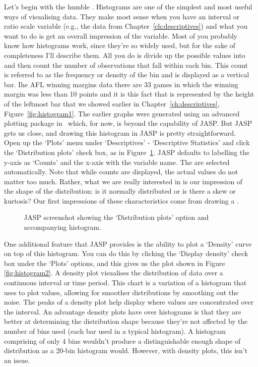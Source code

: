 Let's begin with the humble . Histograms are one of the simplest and most useful ways of visualising data. They make most sense when you have an interval or ratio scale variable (e.g., the  data from Chapter~\ref{ch:descriptives}) and what you want to do is get an overall impression of the variable. Most of you probably know how histograms work, since they're so widely used, but for the sake of completeness I'll describe them. All you do is divide up the possible values into  and then count the number of observations that fall within each bin. This count is referred to as the frequency or density of the bin and is displayed as a vertical bar. Ihe AFL winning margins data there are 33 games in which the winning margin was less than 10 points and it is this fact that is represented by the height of the leftmost bar that we showed earlier in Chapter~\ref{ch:descriptives}, Figure~\ref{fig:histogram1}. The earlier graphs were generated using an advanced plotting package in \R\ which, for now, is beyond the capability of JASP. But JASP gets us close, and drawing this histogram in JASP is pretty straightforward. Open up the `Plots' menu under `Descriptives' - `Descriptive Statistics' and click the `Distribution plots' check box, as in Figure~\ref{fig:jasp_histogram}. JASP defaults to labelling the y-axis as `Counts' and the x-axis with the variable name. The  are selected automatically. Note that while counts are displayed, the actual values do not matter too much. Rather, what we are really interested in is our impression of the shape of the distribution: is it normally distributed or is there a skew or kurtosis? Our first impressions of these characteristics come from drawing a .

\begin{figure}[htb]
\begin{center}
\caption{JASP screenshot showing the `Distribution plots' option and accompanying histogram.}
\label{fig:jasp_histogram}
\HR
\end{center}
\end{figure}

One additional feature that JASP provides is the ability to plot a `Density' curve on top of this histogram. You can do this by clicking the `Display density' check box under the `Plots' options, and this gives us the plot shown in Figure \ref{fig:histogram2}. A density plot visualises the distribution of data over a continuous interval or time period. This chart is a variation of a histogram that uses  to plot values, allowing for smoother distributions by smoothing out the noise. The peaks of a density plot help display where values are concentrated over the interval. An advantage density plots have over histograms is that they are better at determining the distribution shape because they're not affected by the number of bins used (each bar used in a typical histogram). A histogram comprising of only 4 bins wouldn't produce a distinguishable enough shape of distribution as a 20-bin histogram would. However, with density plots, this isn't an issue. 

